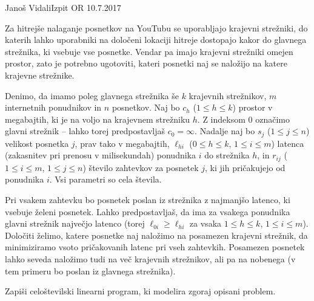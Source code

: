 \begin{naloga}{Janoš Vidali}{Izpit OR 10.7.2017}
\begin{vprasanje}
Za hitrejše nalaganje posnetkov na YouTubu se uporabljajo krajevni strežniki,
do katerih lahko uporabniki na določeni lokaciji hitreje dostopajo
kakor do glavnega strežnika, ki vsebuje vse posnetke.
Vendar pa imajo krajevni strežniki omejen prostor,
zato je potrebno ugotoviti,
kateri posnetki naj se naložijo na katere krajevne strežnike.

Denimo, da imamo poleg glavnega strežnika še $k$ krajevnih strežnikov,
$m$ internetnih po\-nud\-ni\-kov in $n$ posnetkov.
Naj bo $c_h$ ($1 \le h \le k$) prostor v megabajtih,
ki je na voljo na krajevnem strežniku $h$.
Z indeksom $0$ označimo glavni strežnik
-- lahko torej predpostavljaš $c_0 = \infty$.
Nadalje naj bo $s_j$ ($1 \le j \le n$) velikost posnetka $j$,
prav tako v megabajtih,
$\ell_{hi}$ ($0 \le h \le k$, $1 \le i \le m$)
latenca (zakasnitev pri prenosu v milisekundah)
ponudnika $i$ do strežnika $h$,
in $r_{ij}$ ($1 \le i \le m$, $1 \le j \le n$)
število zahtevkov za posnetek $j$, ki jih pričakujejo od ponudnika $i$.
Vsi parametri so cela števila.

Pri vsakem zahtevku bo posnetek poslan iz strežnika z najmanjšo latenco,
ki vsebuje želeni posnetek.
Lahko predpostavljaš,
da ima za vsakega ponudnika glavni strežnik največjo latenco
(torej $\ell_{0i} \ge \ell_{hi}$ za vsaka $1 \le h \le k$, $1 \le i \le m$).
Določiti želimo, katere posnetke naj naložimo na posamezen krajevni strežnik,
da minimiziramo vsoto pričakovanih latenc pri vseh zahtevkih.
Posamezen posnetek lahko seveda naložimo tudi na več krajevnih strežnikov,
ali pa na nobenega (v tem primeru bo poslan iz glavnega strežnika).

Zapiši celoštevilski linearni program, ki modelira zgoraj opisani problem.
\end{vprasanje}
\begin{odgovor}
\end{odgovor}
\end{naloga}


